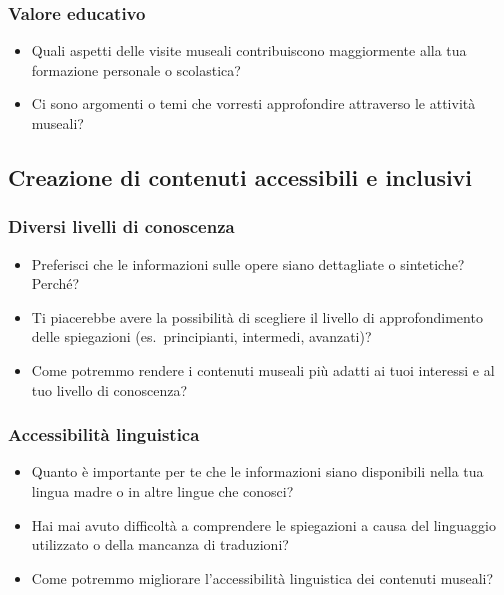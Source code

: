 \documentclass{article}
\begin{document}
\subsubsection{Valore educativo}

\begin{itemize}
    \item Quali aspetti delle visite museali contribuiscono maggiormente alla tua formazione personale o scolastica?
    \item Ci sono argomenti o temi che vorresti approfondire attraverso le attività museali?
\end{itemize}

\subsection{Creazione di contenuti accessibili e inclusivi}

\subsubsection{Diversi livelli di conoscenza}

\begin{itemize}
    \item Preferisci che le informazioni sulle opere siano dettagliate o sintetiche? Perché?
    \item Ti piacerebbe avere la possibilità di scegliere il livello di approfondimento delle spiegazioni (es.\ principianti, intermedi, avanzati)?
    \item Come potremmo rendere i contenuti museali più adatti ai tuoi interessi e al tuo livello di conoscenza?
\end{itemize}

\subsubsection{Accessibilità linguistica}

\begin{itemize}
    \item Quanto è importante per te che le informazioni siano disponibili nella tua lingua madre o in altre lingue che conosci?
    \item Hai mai avuto difficoltà a comprendere le spiegazioni a causa del linguaggio utilizzato o della mancanza di traduzioni?
    \item Come potremmo migliorare l’accessibilità linguistica dei contenuti museali?
\end{itemize}
\end{document}
